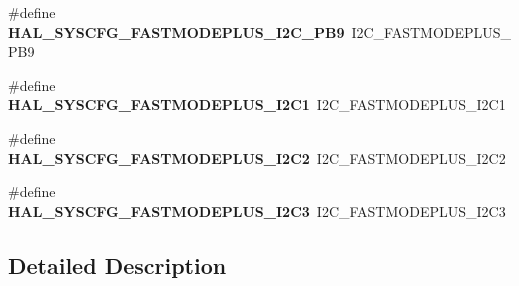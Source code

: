 \begin{DoxyCompactItemize}
\item 
\#define {\bfseries H\+A\+L\+\_\+\+S\+Y\+S\+C\+F\+G\+\_\+\+F\+A\+S\+T\+M\+O\+D\+E\+P\+L\+U\+S\+\_\+\+I2\+C\+\_\+\+P\+B9}~I2\+C\+\_\+\+F\+A\+S\+T\+M\+O\+D\+E\+P\+L\+U\+S\+\_\+\+P\+B9\hypertarget{group___h_a_l___s_y_s_c_f_g___aliased___defines_ga8ace04770933b1fbf1b0e28abd6f3a25}{}\label{group___h_a_l___s_y_s_c_f_g___aliased___defines_ga8ace04770933b1fbf1b0e28abd6f3a25}

\item 
\#define {\bfseries H\+A\+L\+\_\+\+S\+Y\+S\+C\+F\+G\+\_\+\+F\+A\+S\+T\+M\+O\+D\+E\+P\+L\+U\+S\+\_\+\+I2\+C1}~I2\+C\+\_\+\+F\+A\+S\+T\+M\+O\+D\+E\+P\+L\+U\+S\+\_\+\+I2\+C1\hypertarget{group___h_a_l___s_y_s_c_f_g___aliased___defines_gad982b1937d6178bc74b6f95e3d343ab1}{}\label{group___h_a_l___s_y_s_c_f_g___aliased___defines_gad982b1937d6178bc74b6f95e3d343ab1}

\item 
\#define {\bfseries H\+A\+L\+\_\+\+S\+Y\+S\+C\+F\+G\+\_\+\+F\+A\+S\+T\+M\+O\+D\+E\+P\+L\+U\+S\+\_\+\+I2\+C2}~I2\+C\+\_\+\+F\+A\+S\+T\+M\+O\+D\+E\+P\+L\+U\+S\+\_\+\+I2\+C2\hypertarget{group___h_a_l___s_y_s_c_f_g___aliased___defines_gaa415be62939648ababfdce87dea7c8d4}{}\label{group___h_a_l___s_y_s_c_f_g___aliased___defines_gaa415be62939648ababfdce87dea7c8d4}

\item 
\#define {\bfseries H\+A\+L\+\_\+\+S\+Y\+S\+C\+F\+G\+\_\+\+F\+A\+S\+T\+M\+O\+D\+E\+P\+L\+U\+S\+\_\+\+I2\+C3}~I2\+C\+\_\+\+F\+A\+S\+T\+M\+O\+D\+E\+P\+L\+U\+S\+\_\+\+I2\+C3\hypertarget{group___h_a_l___s_y_s_c_f_g___aliased___defines_ga3347764cd910d40c261ffcfa150b0912}{}\label{group___h_a_l___s_y_s_c_f_g___aliased___defines_ga3347764cd910d40c261ffcfa150b0912}

\end{DoxyCompactItemize}


\subsection{Detailed Description}
